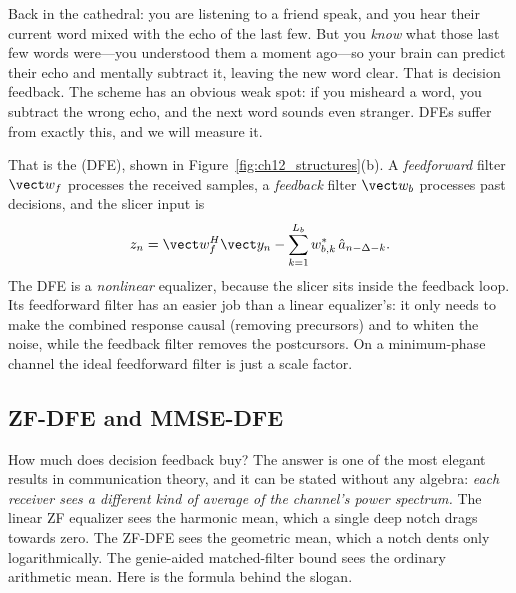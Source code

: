 \begin{analogy}
Back in the cathedral: you are listening to a friend speak, and you hear their current word mixed
with the echo of the last few. But you \emph{know} what those last few words were---you understood
them a moment ago---so your brain can predict their echo and mentally subtract it, leaving the new
word clear. That is decision feedback. The scheme has an obvious weak spot: if you misheard a word,
you subtract the wrong echo, and the next word sounds even stranger. DFEs suffer from exactly this,
and we will measure it.
\end{analogy}

That is the  (DFE), shown in
Figure~\ref{fig:ch12_structures}(b). A \emph{feedforward} filter $\vect w_f$ processes the received
samples, a \emph{feedback} filter $\vect w_b$ processes past decisions, and the slicer input is
\begin{equation}
z_n=\vect w_f^H\vect y_n-\sum_{k=1}^{L_b}w_{b,k}^*\,\hat a_{n-\Delta-k}.
\label{eq:ch12:dfe}
\end{equation}
The DFE is a \emph{nonlinear} equalizer, because the slicer sits inside the feedback loop. Its
feedforward filter has an easier job than a linear equalizer's: it only needs to make the combined
response causal (removing precursors) and to whiten the noise, while the feedback filter removes the
postcursors. On a minimum-phase channel the ideal feedforward filter is just a scale factor.

\subsection{ZF-DFE and MMSE-DFE}

How much does decision feedback buy? The answer is one of the most elegant results in
communication theory, and it can be stated without any algebra: \emph{each receiver sees a
different kind of average of the channel's power spectrum.} The linear ZF equalizer sees the
harmonic mean, which a single deep notch drags towards zero. The ZF-DFE sees the geometric mean,
which a notch dents only logarithmically. The genie-aided matched-filter bound sees the ordinary
arithmetic mean. Here is the formula behind the slogan.

